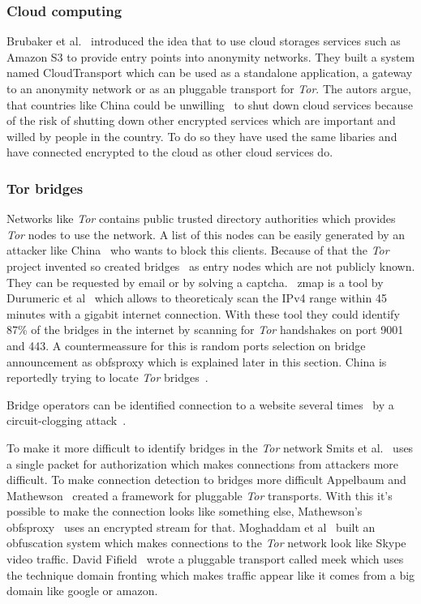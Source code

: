 \documentclass{sig-alternate}
\begin{document}
\subsubsection{Cloud computing}

Brubaker et al.~\cite{brubakercloudtransport} introduced the idea that to use cloud storages services such as Amazon S3 to provide entry points into anonymity networks. They built a system named CloudTransport which can be used as a standalone application, a gateway to an anonymity network or as an pluggable transport for \textit{Tor}. The autors argue, that countries like China could be unwilling~\cite{linkThirteen} to shut down cloud services because of the risk of shutting down other encrypted services which are important and willed by people in the country. To do so they have used the same libaries and have connected encrypted to the cloud as other cloud services do.

\subsubsection{Tor bridges}
 
Networks like \textit{Tor} contains public trusted directory authorities which provides \textit{Tor} nodes to use the network. A list of this nodes can be easily generated by an attacker like China~\cite{lewman2010china} who wants to block this clients. Because of that the \textit{Tor} project invented so created bridges~\cite{linkFourteen} as entry nodes which are not publicly known. They can be requested by email or by solving a captcha.~\cite{linkBrideProject} zmap is a tool by Durumeric et al~\cite{durumeric2013zmap} which allows to theoreticaly scan the IPv4 range within 45 minutes with a gigabit internet connection. With these tool they could identify 87\% of the bridges in the internet by scanning for \textit{Tor} handshakes on port 9001 and 443. A countermeassure for this is random ports selection on bridge announcement as obfsproxy which is explained later in this section. China is reportedly trying to locate \textit{Tor} bridges~\cite{linkKnockKnockProject, winter2012china}.
 
Bridge operators can be identified connection to a website several times~\cite{mclachlan2009risks} by a circuit-clogging attack~\cite{murdoch2005low}. 
 
 To make it more difficult to identify bridges in the \textit{Tor} network Smits et al.~\cite{smits2011bridgespa}
uses a single packet for authorization which makes connections from attackers more difficult. 
To make connection detection to bridges more difficult Appelbaum and Mathewson~\cite{appelbaum2010pluggable} created a framework for pluggable \textit{Tor} transports. With this it's possible to make the connection looks like something else, Mathewson's obfsproxy~\cite{gitlink} uses an encrypted stream for that. Moghaddam et al~\cite{mohajeri2012skypemorph} built an obfuscation system which makes connections to the \textit{Tor} network look like Skype video traffic. David Fifield~\cite{pluggableTransport} wrote a pluggable transport called meek which uses the technique domain fronting which makes traffic appear like it comes from a big domain like google or amazon.
\end{document}
